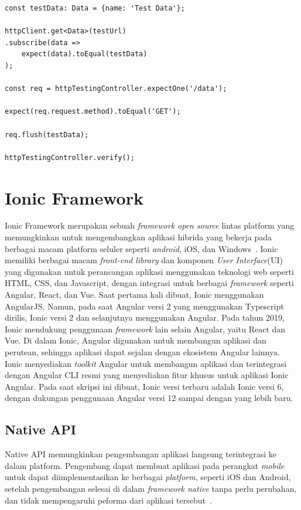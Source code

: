 \begin{enumerate}
\newpage	
	
\begin{lstlisting}[label={lst:httpclientsubscribe}, caption={Contoh \textit{Routing} pada Angular}]
const testData: Data = {name: 'Test Data'};

httpClient.get<Data>(testUrl)
.subscribe(data =>
	expect(data).toEqual(testData)
);

const req = httpTestingController.expectOne('/data');

expect(req.request.method).toEqual('GET');
  
req.flush(testData);

httpTestingController.verify();

\end{lstlisting}
\end{enumerate}


\section{Ionic Framework}
\label{sec:ionicframework} 
 
Ionic Framework merupakan sebuah {\it framework open source} lintas platform yang memungkinkan untuk mengembangkan aplikasi hibrida yang bekerja pada berbagai macam platform seluler seperti {\it android}, iOS, dan Windows~\cite{waranashiwar:18:ionic}. Ionic memiliki berbagai macam \textit{front-end library} dan komponen \textit{User Interface}(UI) yang digunakan untuk  perancangan aplikasi menggunakan teknologi web seperti HTML, CSS, dan Javascript, dengan integrasi untuk berbagai \textit{framework} seperti Angular, React, dan Vue. Saat pertama kali dibuat, Ionic menggunakan AngularJS. Namun, pada saat Angular versi 2 yang menggunakan Typescript dirilis, Ionic versi 2 dan selanjutnya menggunakan Angular. Pada tahun 2019, Ionic mendukung penggunaan \textit{framework} lain selain Angular, yaitu React dan Vue. Di dalam Ionic, Angular digunakan untuk membangun aplikasi dan perutean, sehingga aplikasi dapat sejalan dengan ekosistem Angular lainnya. Ionic menyediakan {\it toolkit} Angular untuk membangun aplikasi dan terintegrasi dengan Angular CLI resmi yang menyediakan fitur khusus untuk aplikasi Ionic Angular. Pada saat skripsi ini dibuat, Ionic versi terbaru adalah Ionic versi 6, dengan dukungan penggunaan Angular versi 12 sampai dengan yang lebih baru.  

\subsection{Native API}
\label{subsec:nativeApi}
Native API memungkinkan pengembangan aplikasi langsung terintegrasi ke dalam platform. Pengembang dapat membuat aplikasi pada perangkat {\it mobile} untuk dapat diimplementasikan ke berbagai {\it platform}, seperti iOS dan Android, setelah pengembangan selesai di dalam {\it framework native} tanpa perlu perubahan, dan tidak mempengaruhi peforma dari aplikasi tersebut~\cite{griffith:17:mobile}. 

